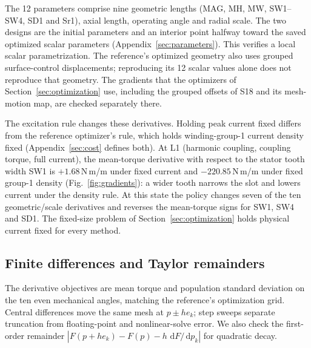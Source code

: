 \documentclass{anvil-paper}
\newcommand{\dd}{\,\mathrm{d}}
\begin{document}
The 12 parameters comprise nine geometric lengths (MAG, MH, MW,
SW1--SW4, SD1 and Sr1), axial length, operating angle and radial scale.
The two designs are the initial parameters and an interior point halfway
toward the saved optimized scalar parameters
(Appendix~\ref{sec:parameters}). This verifies a local scalar
parametrization. The reference's optimized geometry also uses grouped
surface-control displacements; reproducing its 12 scalar values alone
does not reproduce that geometry. The gradients that the optimizers of
Section~\ref{sec:optimization} use, including the grouped offsets of S18
and its mesh-motion map, are checked separately there.

The excitation rule changes these derivatives. Holding peak current fixed
differs from the reference optimizer's rule, which holds winding-group-1
current density fixed (Appendix~\ref{sec:cost} defines both). At L1
(harmonic coupling, coupling torque, full current), the mean-torque
derivative with respect to the stator tooth width SW1 is $+1.68$\,N\,m/m
under fixed current and $-220.85$\,N\,m/m under fixed group-1 density
(Fig.~\ref{fig:gradients}): a wider tooth narrows the slot and lowers
current under the density rule. At this state the policy changes seven of
the ten geometric/scale derivatives and reverses the mean-torque signs for
SW1, SW4 and SD1. The fixed-size problem of Section~\ref{sec:optimization}
holds physical current fixed for every method.

\subsection{Finite differences and Taylor remainders}
The derivative objectives are mean torque and population standard
deviation on the ten even mechanical angles, matching the reference's
optimization grid. Central differences move the same mesh at $p\pm h e_k$;
step sweeps separate truncation from floating-point and nonlinear-solve
error. We also check the first-order remainder
$|F(p+h e_k)-F(p)-h\,\dd F/\dd p_k|$ for quadratic decay.
\end{document}
